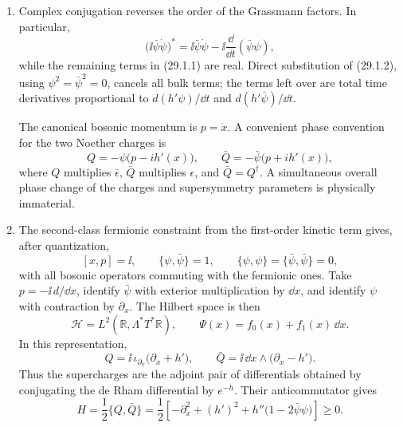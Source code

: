 
\begin{enumerate}
  \begin{enumerate}
    \item Complex conjugation reverses the order of the Grassmann factors.
    In particular,
    \[
      \bigl(\ii\bar\psi\dot\psi\bigr)^*
       =\ii\bar\psi\dot\psi
        -\ii\frac{\dd}{\dd t}(\bar\psi\psi),
    \]
    while the remaining terms in (29.1.1) are real.  Direct substitution
    of (29.1.2), using \(\psi^2=\bar\psi^2=0\), cancels all bulk terms;
    the terms left over are total time derivatives proportional to
    \(d(h'\psi)/\dd t\) and \(d(h'\bar\psi)/\dd t\).

    The canonical bosonic momentum is \(p=\dot x\).  A convenient phase
    convention for the two Noether charges is
    \[
      \boxed{
      Q=-\psi\bigl(p-ih'(x)\bigr),
      \qquad
      \bar Q=-\bar\psi\bigl(p+ih'(x)\bigr),}
      \tag{29.1.S1}
    \]
    where \(Q\) multiplies \(\bar\epsilon\), \(\bar Q\) multiplies
    \(\epsilon\), and \(\bar Q=Q^\dagger\).  A simultaneous overall phase
    change of the charges and supersymmetry parameters is physically
    immaterial.

    \item The second-class fermionic constraint from the first-order
    kinetic term gives, after quantization,
    \[
      [x,p]=\ii,
      \qquad \{\psi,\bar\psi\}=1,
      \qquad \{\psi,\psi\}=\{\bar\psi,\bar\psi\}=0,
      \tag{29.1.S2}
    \]
    with all bosonic operators commuting with the fermionic ones.  Take
    \(p=-\ii\,d/\dd x\), identify \(\bar\psi\) with exterior multiplication by
    \(\dd x\), and identify \(\psi\) with contraction by
    \(\partial_x\).  The Hilbert space is then
    \[
      \mathcal H=L^2\!\left(\mathbb R,\Lambda^*T^*\mathbb R\right),
      \qquad
      \Psi(x)=f_0(x)+f_1(x)\,\dd x.
      \tag{29.1.S3}
    \]
    In this representation,
    \[
      Q=\ii\,\iota_{\partial_x}\bigl(\partial_x+h'\bigr),
      \qquad
      \bar Q=\ii\,\dd x\wedge\bigl(\partial_x-h'\bigr).
      \tag{29.1.S4}
    \]
    Thus the supercharges are the adjoint pair of differentials obtained
    by conjugating the de Rham differential by \(e^{-h}\).  Their
    anticommutator gives
    \[
      H=\frac12\{Q,\bar Q\}
       =\frac12\left[-\partial_x^2+(h')^2
          +h''\bigl(1-2\bar\psi\psi\bigr)\right]\geq0.
      \tag{29.1.S5}
    \]


\end{enumerate}
\end{enumerate}
